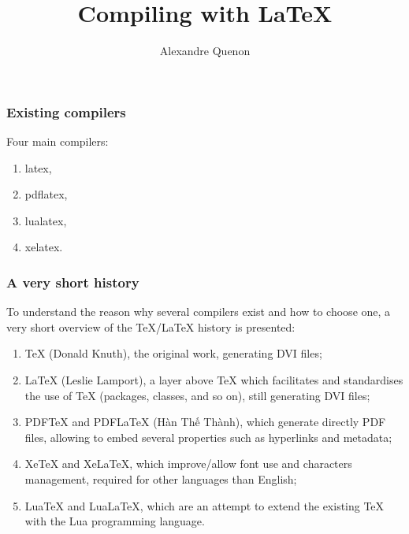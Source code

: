 \documentclass[11pt]{beamer}
\title{Compiling with \LaTeX}
\author[A. Quenon]{Alexandre Quenon}
\begin{document}


\begin{frame}
	\titlepage
\end{frame}


\begin{frame}
	\frametitle{Existing compilers}
	
	Four main compilers:
	\begin{enumerate}
		\item latex,
		\item pdflatex,
		\item lualatex,
		\item xelatex.
	\end{enumerate}
\end{frame}


\begin{frame}
	\frametitle{A very short history}
	
	To understand the reason why several compilers exist and how to choose one, a very short overview of the \TeX/\LaTeX{} history is presented:
	\begin{enumerate}
		\item \TeX{} (Donald Knuth), the original work, generating DVI files;
		\item \LaTeX{} (Leslie Lamport), a layer above \TeX{} which facilitates and standardises the use of \TeX{} (packages, classes, and so on), still generating DVI files;
		\item PDFTeX and PDFLaTeX (Hàn Thế Thành), which generate directly PDF files, allowing to embed several properties such as hyperlinks and metadata;
		\item XeTeX and XeLaTeX, which improve/allow font use and characters management, required for other languages than English;
		\item LuaTeX and LuaLaTeX, which are an attempt to extend the existing \TeX{} with the Lua programming language.
	\end{enumerate}
\end{frame}
\end{document}
